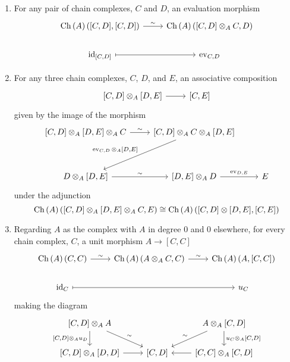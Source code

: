 \documentclass[dissertation.tex]{subfiles}
\begin{document}
\begin{rmk}\label{MorphismsOfDGModules}
  \begin{enumerate}
    The adjunction above gives rise to the following morphisms in $\Ch{A}$:
  \item
    For any pair of chain complexes, $C$ and $D$, an evaluation morphism
    $$\begin{tikzcd}
      \Ch{A}\left([C,D],[C,D]\right) \arrow{r}{\sim} & \Ch{A}\left([C,D] \otimes_A C, D\right)\\
      \id_{[C,D]} \arrow[mapsto]{r} & \operatorname{ev}_{C,D}
    \end{tikzcd}$$
  \item\label{MorphismsOfDGModules.composition}
    For any three chain complexes, $C$, $D$, and $E$, an associative composition 
    $$\begin{tikzcd}
      \left[C,D\right] \otimes_A \left[D,E\right] \arrow{r} & \left[C,E\right]
    \end{tikzcd}$$
    given by the image of the morphism
    $$\begin{tikzcd}
      \left[C,D\right] \otimes_A \left[D,E\right] \otimes_A C \arrow{r}{\sim} &
      \left[C,D\right] \otimes_A C \otimes_A \left[D,E\right] \arrow[swap]{ldd}{\operatorname{ev}_{C,D} \otimes_A [D,E]}\\
      \\
      D \otimes_A \left[D,E\right] \arrow{r}{\sim} & 
      \left[D,E\right] \otimes_A D \arrow{r}{\operatorname{ev}_{D,E}} &
      E
    \end{tikzcd}$$
    under the adjunction
    $$\Ch{A}\left([C,D] \otimes_A [D,E] \otimes_A C, E\right) \cong 
    \Ch{A}\left([C,D] \otimes [D,E], [C,E]\right)$$
  \item
    Regarding $A$ as the complex with $A$ in degree 0 and 0 elsewhere, for every chain complex, $C$, a unit morphism $A \to [C,C]$
    $$\begin{tikzcd}
      \Ch{A}(C,C) \arrow{r}{\sim} & \Ch{A}(A \otimes_A C, C) \arrow{r}{\sim} & \Ch{A}\left(A, [C,C]\right)\\
      \id_C \arrow[mapsto]{rr} & & u_C
    \end{tikzcd}$$
    making the diagram
    $$\begin{tikzcd}
      \left[C,D\right] \otimes_A A \arrow[swap]{d}{[C,D] \otimes_A u_D}\arrow{rd}{\sim} & & A \otimes_A \left[C,D\right]\arrow[swap]{ld}{\sim}\arrow{d}{u_C \otimes_A [C,D]}\\
      \left[C,D\right] \otimes_A \left[D,D\right]\arrow{r} & \left[C,D\right] &  \left[C,C\right] \otimes_A \left[C,D\right]\arrow{l}

\end{tikzcd}$$
\end{enumerate}
\end{rmk}
\end{document}
